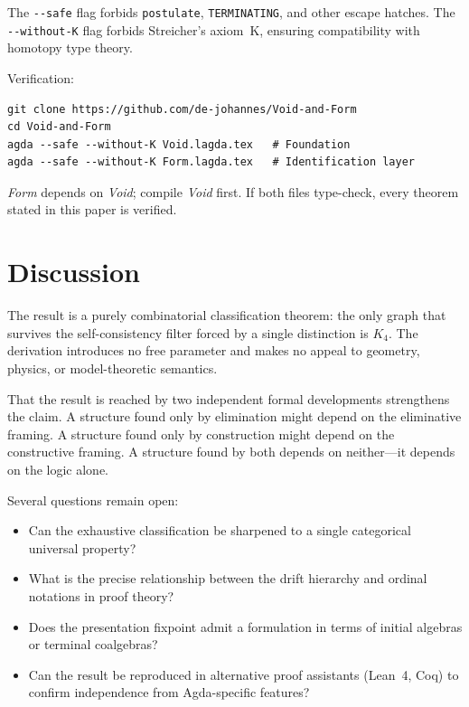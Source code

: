 \documentclass[11pt,a4paper]{article}
\theoremstyle{definition}
\begin{document}
The \texttt{-{}-safe} flag forbids \texttt{postulate}, \texttt{TERMINATING},
and other escape hatches.  The \texttt{-{}-without-K} flag forbids
Streicher's axiom~K, ensuring compatibility with homotopy type theory.

\medskip
\noindent Verification:
\begin{lstlisting}
git clone https://github.com/de-johannes/Void-and-Form
cd Void-and-Form
agda --safe --without-K Void.lagda.tex   # Foundation
agda --safe --without-K Form.lagda.tex   # Identification layer
\end{lstlisting}

\noindent \textit{Form} depends on \textit{Void}; compile \textit{Void} first.
If both files type-check, every theorem stated in this paper is verified.

\section{Discussion}
\label{sec:discussion}

The result is a purely combinatorial classification theorem: the only
graph that survives the self-consistency filter forced by a single distinction
is $K_4$.  The derivation introduces no free parameter and makes no
appeal to geometry, physics, or model-theoretic semantics.

That the result is reached by two independent formal developments
strengthens the claim.  A structure found only by elimination might depend
on the eliminative framing.  A structure found only by construction might
depend on the constructive framing.  A structure found by both depends on
neither---it depends on the logic alone.

Several questions remain open:

\begin{itemize}[nosep]
  \item Can the exhaustive classification be sharpened to a single
        categorical universal property?
  \item What is the precise relationship between the drift hierarchy
        and ordinal notations in proof theory?
  \item Does the presentation fixpoint admit a formulation in terms of
        initial algebras or terminal coalgebras?
  \item Can the result be reproduced in alternative proof assistants
        (Lean~4, Coq) to confirm independence from Agda-specific features?
\end{itemize}
\end{document}
